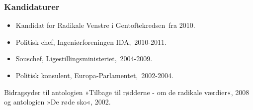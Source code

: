 \documentclass[11pt, a4paper]{awesome-cv}
\begin{document}
\begin{cvletter}
\subsubsection*{Kandidaturer}
\begin{itemize}
\item Kandidat for Radikale Venstre i Gentoftekredsen fra 2010.
\end{itemize}
\begin{itemize}
\item Politisk chef, Ingeniørforeningen IDA, 2010-2011.
\item Souschef, Ligestillingsministeriet, 2004-2009.
\item Politisk konsulent, Europa-Parlamentet, 2002-2004.
\end{itemize}
Bidragsyder til antologien »Tilbage til rødderne - om de radikale værdier«, 2008 og antologien  »De røde sko«, 2002.

\end{cvletter}
\end{document}
